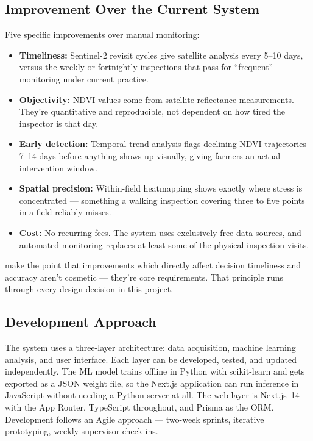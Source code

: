 \documentclass[12pt,a4paper]{report}
\begin{document}
\subsection{Improvement Over the Current System}

Five specific improvements over manual monitoring:

\begin{itemize}
  \item \textbf{Timeliness:} Sentinel-2 revisit cycles give satellite analysis every 5--10 days, versus the weekly or fortnightly inspections that pass for ``frequent'' monitoring under current practice.
  \item \textbf{Objectivity:} NDVI values come from satellite reflectance measurements. They're quantitative and reproducible, not dependent on how tired the inspector is that day.
  \item \textbf{Early detection:} Temporal trend analysis flags declining NDVI trajectories 7--14 days before anything shows up visually, giving farmers an actual intervention window.
  \item \textbf{Spatial precision:} Within-field heatmapping shows exactly where stress is concentrated — something a walking inspection covering three to five points in a field reliably misses.
  \item \textbf{Cost:} No recurring fees. The system uses exclusively free data sources, and automated monitoring replaces at least some of the physical inspection visits.
\end{itemize}

\citet{pfleeger2010} make the point that improvements which directly affect decision timeliness and accuracy aren't cosmetic — they're core requirements. That principle runs through every design decision in this project.

\subsection{Development Approach}

The system uses a three-layer architecture: data acquisition, machine learning analysis, and user interface. Each layer can be developed, tested, and updated independently. The ML model trains offline in Python with scikit-learn \citep{pedregosa2011} and gets exported as a JSON weight file, so the Next.js application can run inference in JavaScript without needing a Python server at all. The web layer is Next.js~14 with the App Router, TypeScript throughout, and Prisma as the ORM. Development follows an Agile approach — two-week sprints, iterative prototyping, weekly supervisor check-ins.
\end{document}
